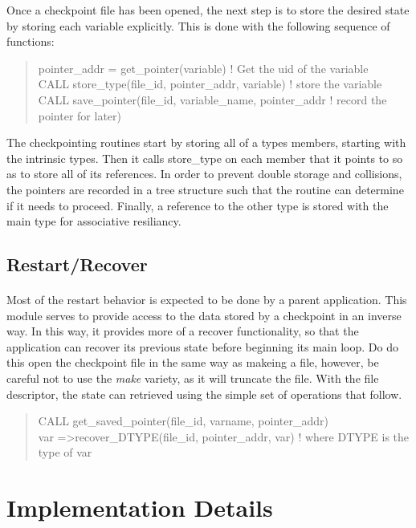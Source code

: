 \documentclass{article}
\begin{document}
Once a checkpoint file has been opened, the next step is to store the desired state by storing each variable explicitly. This is done with the following sequence of functions:
\begin{quote}
   pointer\_addr = get\_pointer(variable) ! Get the uid of the variable \\
   CALL store\_type(file\_id, pointer\_addr, variable) ! store the variable \\
   CALL save\_pointer(file\_id, variable\_name, pointer\_addr ! record the pointer for later) \\
\end{quote}

The checkpointing routines start by storing all of a types members, starting with the intrinsic types. Then it calls store\_type on each member that it points to so as to store all of its references. In order to prevent double storage and collisions, the pointers are recorded in a tree structure such that the routine can determine if it needs to proceed. Finally, a reference to the other type is stored with the main type for associative resiliancy.

\subsection{Restart/Recover}
\paragraph{}
Most of the restart behavior is expected to be done by a parent application. This module serves to provide access to the data stored by a checkpoint in an inverse way. In this way, it provides more of a recover functionality, so that the application can recover its previous state before beginning its main loop. Do do this open the checkpoint file in the same way as makeing a file, however, be careful not to use the \emph{make} variety, as it will truncate the file. With the file descriptor, the state can retrieved using the simple set of operations that follow.
\begin{quote}
   CALL get\_saved\_pointer(file\_id, varname, pointer\_addr) \\
   var =\textgreater recover\_DTYPE(file\_id, pointer\_addr, var) ! where DTYPE is the type of var
\end{quote}
\section{Implementation Details}
\end{document}
